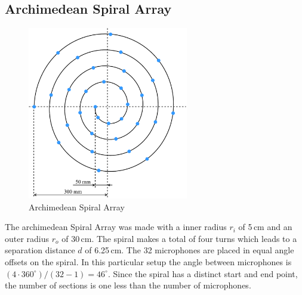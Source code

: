 \subsection{Archimedean Spiral Array}
\begin{minipage}{\linewidth}
	\begin{figure}
		\vspace{-0.9cm}
		\includegraphics[width=7cm]{images/5_array_evaluation/prototype_array_archimedian_spiral.pdf}
		\centering
		\caption{Archimedean Spiral Array}
		\label{fig:prototype_array_archimedian_spiral}
	\end{figure}
	The archimedean Spiral Array was made with a inner radius $r_i$ of 5\,cm and an outer radius $r_o$ of 30\,cm.
	The spiral makes a total of four turns which leads to a separation distance $d$ of 6.25\,cm.
	The 32 microphones are placed in equal angle offsets on the spiral.
	In this particular setup the angle between microphones is $(4 \cdot 360^\circ) / (32 - 1) = 46^\circ$.
	Since the spiral has a distinct start and end point, the number of sections is one less than the number of microphones.
\end{minipage}
\newpage

